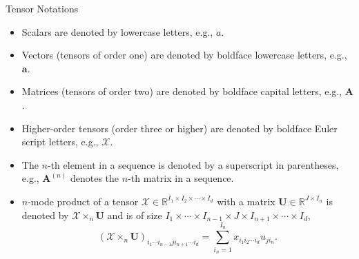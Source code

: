 \documentclass[t, 10pt, handout, aspectratio=169]{beamer}
\begin{document}
\begin{frame}{Tensor Notations}
\begin{itemize}
\item Scalars are denoted by lowercase letters, e.g., $a$.
\item Vectors (tensors of order one) are denoted by boldface lowercase letters, e.g., $\mathbf{a}$.
\item Matrices (tensors of order two) are denoted by boldface capital letters, e.g., $\mathbf{A}$.
\item Higher-order tensors (order three or higher) are denoted by boldface Euler script letters, e.g., $\mathcal{X}$.
\item  The $n$-th element in a sequence is denoted by a superscript in parentheses, e.g., $\mathbf{A}^{(n)}$ denotes the $n$-th matrix in a sequence.
\item $n$-mode product of a tensor $\mathcal{X}\in\mathbb{R}^{I_1 \times I_2 \times\cdots\times I_d}$ with a matrix $\mathbf{U}\in\mathbb{R}^{J\times I_n}$ is denoted by $\mathcal{X}\times_n \mathbf{U}$ and is of size $I_1 \times \cdots \times I_{n-1} \times J \times I_{n+1} \times \cdots \times I_d$,
$$
(\mathcal{X}\times_n\mathbf{U})_{i_1\cdots i_{n-1}ji_{n+1}\cdots i_d}=\sum_{i_n=1}^{I_n}x_{i_1i_2\cdots i_d}u_{ji_n}.
$$
\end{itemize}
\end{frame}
\end{document}
